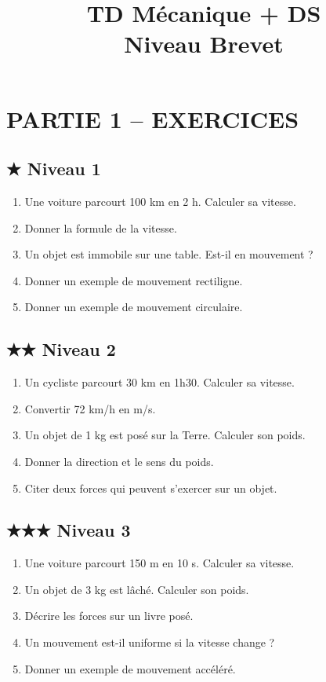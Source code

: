 \documentclass[11pt,a4paper]{article}
\title{\Huge TD Mécanique + DS \\ Niveau Brevet}
\date{}
\begin{document}
\maketitle

\section*{PARTIE 1 – EXERCICES}

\subsection*{★ Niveau 1}

\begin{enumerate}
\item Une voiture parcourt 100 km en 2 h. Calculer sa vitesse.
\item Donner la formule de la vitesse.
\item Un objet est immobile sur une table. Est-il en mouvement ?
\item Donner un exemple de mouvement rectiligne.
\item Donner un exemple de mouvement circulaire.
\end{enumerate}

\subsection*{★★ Niveau 2}

\begin{enumerate}[resume]
\item Un cycliste parcourt 30 km en 1h30. Calculer sa vitesse.
\item Convertir 72 km/h en m/s.
\item Un objet de 1 kg est posé sur la Terre. Calculer son poids.
\item Donner la direction et le sens du poids.
\item Citer deux forces qui peuvent s’exercer sur un objet.
\end{enumerate}

\subsection*{★★★ Niveau 3}

\begin{enumerate}[resume]
\item Une voiture parcourt 150 m en 10 s. Calculer sa vitesse.
\item Un objet de 3 kg est lâché. Calculer son poids.
\item Décrire les forces sur un livre posé.
\item Un mouvement est-il uniforme si la vitesse change ?
\item Donner un exemple de mouvement accéléré.
\end{enumerate}
\end{document}
